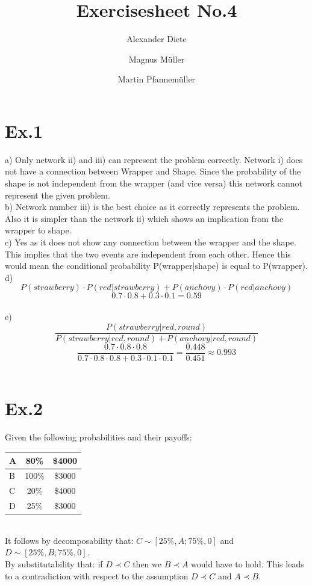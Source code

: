 \documentclass[11pt]{article}
\title{Exercisesheet No.4}
\author{Alexander Diete \and Magnus M\"uller \and Martin Pfannem\"uller}
\begin{document}
\maketitle

\section*{Ex.1}
a) Only network ii) and iii) can represent the problem correctly. Network i) does not have a connection between Wrapper and Shape. Since the probability of the shape is not independent from the wrapper (and vice versa) this network cannot represent the given problem. \\

b) Network number iii) is the best choice as it correctly represents the problem. Also it is simpler than the network ii) which shows an implication from the wrapper to shape. \\

c) Yes as it does not show any connection between the wrapper and the shape. This implies that the two events are independent from each other. Hence this would mean the conditional probability P(wrapper|shape) is equal to P(wrapper). \\

d) 
$$P(strawberry) \cdot P(red|strawberry) + P(anchovy) \cdot P(red|anchovy)$$
$$0.7 \cdot 0.8 + 0.3 \cdot 0.1 = 0.59$$ \\

e)
$$\frac{P(strawberry | red, round)}{P(strawberry | red, round) + P(anchovy | red, round)}$$
$$\frac{0.7 \cdot 0.8 \cdot 0.8}{0.7 \cdot 0.8 \cdot 0.8 + 0.3 \cdot 0.1 \cdot 0.1} = \frac{0.448}{0.451} \approx 0.993$$ \\

\section*{Ex.2}
Given the following probabilities and their payoffs:\\
\begin{tabular}{|l|c|c|}
\hline
    A & 80\% & \$4000 \\
    \hline
    B & 100\% & \$3000 \\
    \hline
    C & 20\% & \$4000 \\
    \hline
    D & 25\% & \$3000 \\
    \hline
\end{tabular}
\\
It follows by decomposability that: $C\sim[25\%,A; 75\%,0]$ and $D\sim[25\%,B;75\%,0]$. \\
By substitutability that: if $D \prec C$ then we $B \prec A$ would have to hold. This leads to a contradiction with respect to the assumption $D \prec C$ and $A \prec B$.
\end{document}
